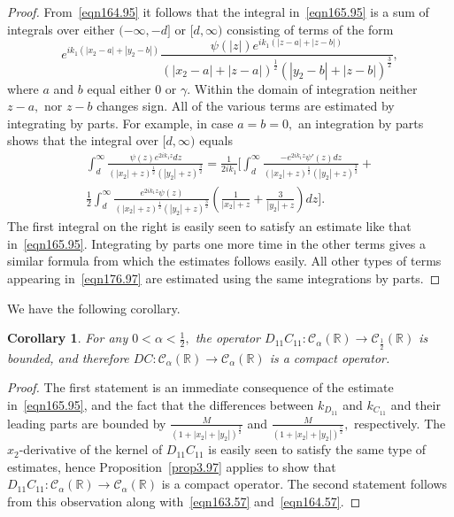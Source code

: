 \documentclass[11pt]{article}
\newcommand\cC{\mathcal{C}}
\newcommand\bbR{\mathbb R}
\newtheorem{corollary}{Corollary}
\theoremstyle{definition}
\theoremstyle{remark}
\begin{document}
   \begin{proof}
     From~\eqref{eqn164.95} it follows that the integral
     in~\eqref{eqn165.95} is a sum of integrals over either
     $(-\infty,-d]$ or $[d,\infty)$ consisting of terms of the form
     \begin{equation}\label{eqn176.97}
               e^{ik_1(|x_2-a|+|y_2-b|)}\frac{\psi(|z|)e^{ik_1
                   (|z-a|+|z-b|)}}{(|x_2-a|+|z-a|)^{\frac
                   12}(|y_2-b|+|z-b|)^{\frac 32}},
     \end{equation}
     where $a$ and $b$ equal either $0$ or $\gamma.$ Within the domain of
     integration neither $z-a,$ nor $z-b$ changes sign. All of the various terms
     are estimated by integrating by parts. For example, in case $a=b=0,$ an
     integration by parts shows that the integral over $[d,\infty)$  equals
     \begin{multline}
      \int_{d}^{\infty}\frac{\psi(z)e^{2ik_1z}dz}{(|x_2|+z)^{\frac
                   12}(|y_2|+z)^{\frac 32}}=
     \frac{1}{2ik_1}\Bigg[ \int_{d}^{\infty}
      \frac{-e^{2ik_1z}\psi'(z)dz}{(|x_2|+z)^{\frac
                12}(|y_2|+z)^{\frac 32}}+\\
            \frac{1}{2}\int_{d}^{\infty}\frac{e^{2ik_1  z}\psi(z)}{(|x_2|+z)^{\frac
                12}(|y_2|+z)^{\frac 32}}\left(\frac{1}{|x_2|+z}+
            \frac{3}{|y_2|+z}\right)dz\Bigg].
     \end{multline}
     The first integral on the right is easily seen to satisfy an estimate like
     that in~\eqref{eqn165.95}.  Integrating by parts one more time in the other
     terms gives a similar formula from which the estimates follows easily. All
     other types of terms appearing in~\eqref{eqn176.97} are estimated using the same integrations by parts.
   \end{proof}

   We have the following corollary.
   \begin{corollary}
  For any $0<\alpha<\frac 12,$ the operator
  $D_{11}C_{11}:\cC_{\alpha}(\bbR)\to\cC_{\frac 12}(\bbR)$ is bounded,
  and therefore $DC:\cC_{\alpha}(\bbR)\to\cC_{\alpha}(\bbR)$ is a compact
  operator.
   \end{corollary}
   \begin{proof}
     The first statement is an immediate consequence of the estimate
     in~\eqref{eqn165.95}, and the fact that the differences between
     $k_{D_{11}}$ and $k_{C_{11}}$ and their leading parts are bounded
     by $\frac{M}{(1+|x_2|+|y_2|)^{\frac 32}}$ and
     $\frac{M}{(1+|x_2|+|y_2|)^{\frac 52}},$ respectively. The
     $x_2$-derivative of the kernel of $D_{11}C_{11}$ is easily seen
     to satisfy the same type of estimates, hence
     Proposition~\ref{prop3.97} applies to show that
     $D_{11}C_{11}:\cC_{\alpha}(\bbR)\to\cC_{\alpha}(\bbR)$ is a
     compact operator.  The second statement follows from this
     observation along with~\eqref{eqn163.57} and~\eqref{eqn164.57}.
   \end{proof}
\end{document}
